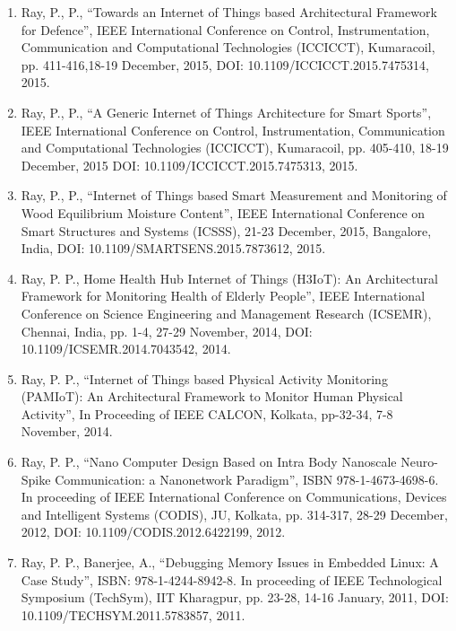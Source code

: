\documentclass[11pt,a4paper]{moderncv}
\begin{document}
\begin{adjustwidth}{6em}{0pt}
\begin{enumerate}
	\item Ray, P., P., “Towards an Internet of Things based Architectural Framework for Defence”, IEEE International Conference on Control, Instrumentation, Communication and Computational Technologies (ICCICCT), Kumaracoil, pp. 411-416,18-19 December, 2015, DOI: 10.1109/ICCICCT.2015.7475314, 2015.
	
	\item Ray, P., P., “A Generic Internet of Things Architecture for Smart Sports”, IEEE International Conference on Control, Instrumentation, Communication and Computational Technologies (ICCICCT), Kumaracoil, pp. 405-410, 18-19 December, 2015 DOI: 10.1109/ICCICCT.2015.7475313, 2015.
	
	\item Ray, P., P., “Internet of Things based Smart Measurement and Monitoring of Wood Equilibrium Moisture Content”, IEEE International Conference on Smart Structures and Systems (ICSSS), 21-23 December, 2015, Bangalore, India, DOI: 10.1109/SMARTSENS.2015.7873612, 2015.
	
	\item Ray, P. P., Home Health Hub Internet of Things (H3IoT): An Architectural Framework for Monitoring Health of Elderly People”, IEEE International Conference on Science Engineering and Management Research (ICSEMR), Chennai, India, pp. 1-4, 27-29 November, 2014, DOI: 10.1109/ICSEMR.2014.7043542, 2014.
	
	\item Ray, P. P., “Internet of Things based Physical Activity Monitoring (PAMIoT): An Architectural Framework to Monitor Human Physical Activity”, In Proceeding of IEEE CALCON, Kolkata, pp-32-34, 7-8 November, 2014.
	
	\item Ray, P. P., “Nano Computer Design Based on Intra Body Nanoscale Neuro-Spike Communication: a Nanonetwork Paradigm”, ISBN 978-1-4673-4698-6. In proceeding of IEEE International Conference on Communications, Devices and Intelligent Systems (CODIS), JU, Kolkata, pp. 314-317, 28-29 December, 2012, DOI: 10.1109/CODIS.2012.6422199, 2012.
	
	\item Ray, P. P., Banerjee, A., “Debugging Memory Issues in Embedded Linux: A Case Study”, ISBN: 978-1-4244-8942-8. In proceeding of IEEE Technological Symposium (TechSym), IIT Kharagpur, pp. 23-28, 14-16 January, 2011, DOI: 10.1109/TECHSYM.2011.5783857, 2011.
	

	\end{enumerate}
\end{adjustwidth}
\end{document}
